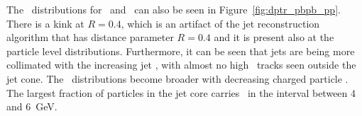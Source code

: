 
The \Dptr\ distributions for \pp\ and \pbpb\ can also be seen in Figure~\ref{fig:dptr_pbpb_pp}. There is a kink at $R = 0.4$, which is an artifact of the jet reconstruction algorithm that has distance parameter $R = 0.4$ and it is present also at the particle level distributions. Furthermore, it can be seen that jets are being more collimated with the increasing jet \pt, with almost no high \pt\ tracks seen outside the jet cone. The \Dptr\ distributions become broader with decreasing charged particle \pT. The largest fraction of particles in the jet core carries \pT\ in the interval between 4 and 6~GeV.  

\begin{figure}
\end{figure}

